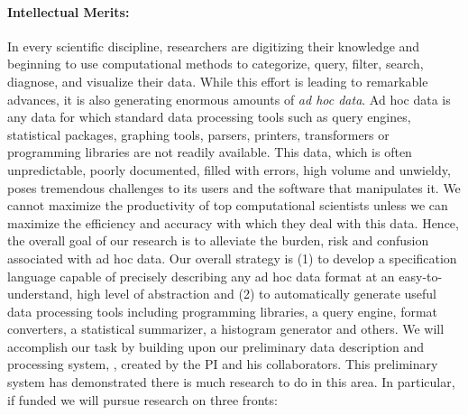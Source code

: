 
\paragraph*{Intellectual Merits:} 
In every scientific discipline, researchers are digitizing their knowledge and
beginning to use computational methods to categorize,
query, filter, search, diagnose, and visualize their data.  
While this effort is leading to remarkable advances,
it is also generating enormous amounts of {\em ad hoc data}.
Ad hoc data is any data for which standard data processing tools
such as query engines, statistical packages, graphing tools, parsers, printers,
transformers or programming libraries are not readily available.
This data, which is often unpredictable, poorly documented,
filled with errors, high volume and unwieldy,
poses tremendous challenges to its users and the software
that manipulates it.  We cannot maximize the productivity of top 
computational scientists unless we can maximize the efficiency and 
accuracy with which they deal with this data.  Hence, the overall goal of
our research is to alleviate the burden, risk and confusion
associated with ad hoc data.  Our overall strategy is (1) to develop a
specification language capable of precisely describing any ad hoc data
format at an easy-to-understand, high level of abstraction and (2) to
automatically generate useful data processing tools including
programming libraries, a query engine, format converters, a
statistical summarizer, a histogram generator and others.
We will accomplish our task by building upon our preliminary data
description and processing system, \pads{}, created by the PI and his
collaborators.  This preliminary system has demonstrated
there is much research to do in this area.  In particular, if funded we 
will pursue research on three fronts:

